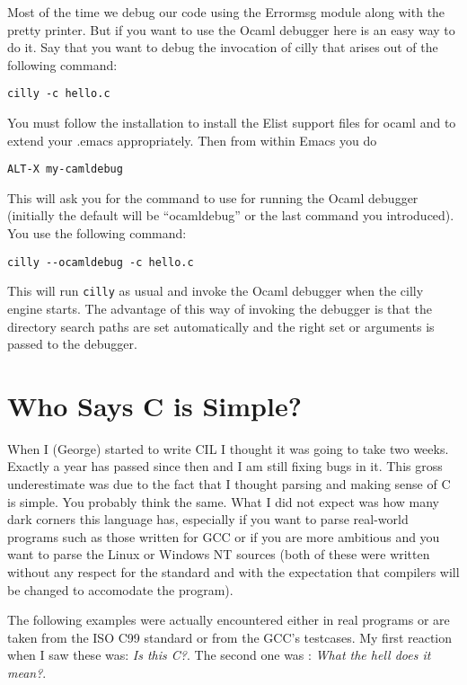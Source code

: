 \documentclass{article}
\def\t#1{{\tt #1}}
\begin{document}
 Most of the time we debug our code using the Errormsg module along with the
pretty printer. But if you want to use the Ocaml debugger here is an easy way
to do it. Say that you want to debug the invocation of cilly that arises out
of the following command:
\begin{verbatim}
cilly -c hello.c 
\end{verbatim}

 You must follow the installation 
to install the Elist support files for ocaml and to extend your .emacs
appropriately. Then from within Emacs you do
\begin{verbatim}
ALT-X my-camldebug
\end{verbatim}

 This will ask you for the command to use for running the Ocaml debugger
(initially the default will be ``ocamldebug'' or the last command you
introduced). You use the following command:
\begin{verbatim}
cilly --ocamldebug -c hello.c 
\end{verbatim}

 This will run \t{cilly} as usual and invoke the Ocaml debugger when the cilly
engine starts. The advantage of this way of invoking the debugger is that the
directory search paths are set automatically and the right set or arguments is
passed to the debugger. 


\section{Who Says C is Simple?}\label{sec-simplec}

 When I (George) started to write CIL I thought it was going to take two weeks.
Exactly a year has passed since then and I am still fixing bugs in it. This
gross underestimate was due to the fact that I thought parsing and making
sense of C is simple. You probably think the same. What I did not expect was
how many dark corners this language has, especially if you want to parse
real-world programs such as those written for GCC or if you are more ambitious
and you want to parse the Linux or Windows NT sources (both of these were
written without any respect for the standard and with the expectation that
compilers will be changed to accomodate the program). 

 The following examples were actually encountered either in real programs or
are taken from the ISO C99 standard or from the GCC's testcases. My first
reaction when I saw these was: {\em Is this C?}. The second one was : {\em
What the hell does it mean?}. 
\end{document}
